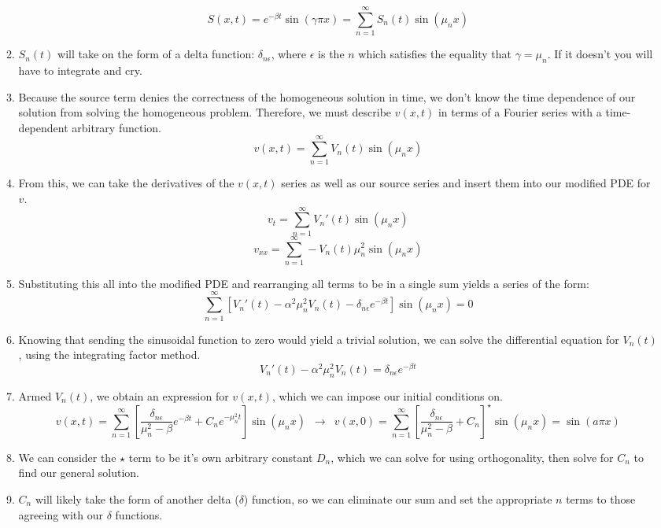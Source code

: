 \documentclass{article}
\begin{document}
\begin{enumerate}
\begin{enumerate}
        \[
            S(x,t) = e^{-\beta t}\sin(\gamma\pi x) = \sum_{n=1}^\infty S_n(t)\sin(\mu_n x)
        \]
        \item $S_n(t)$ will take on the form of a delta function: $\delta_{n\epsilon}$, where $\epsilon$ is the $n$ which satisfies the equality that $\gamma = \mu_n$. If it doesn't you will have to integrate and cry.
        \item Because the source term denies the correctness of the homogeneous solution in time, we don't know the time dependence of our solution from solving the homogeneous problem. Therefore, we must describe $v(x,t)$ in terms of a Fourier series with a time-dependent arbitrary function.
        \[
            v(x,t) = \sum_{n=1}^\infty V_n(t)\sin(\mu_n x)
        \]
        \item From this, we can take the derivatives of the $v(x,t)$ series as well as our source series and insert them into our modified PDE for $v$.
        \[
            v_t = \sum_{n=1}^\infty V_n'(t)\sin(\mu_n x)
        \]
        \[
            v_{xx} = \sum_{n=1}^\infty -V_n(t)\mu_n^2\sin(\mu_n x)
        \]
        \item Substituting this all into the modified PDE and rearranging all terms to be in a single sum yields a series of the form:
        \[
            \sum_{n=1}^\infty \left[V_n'(t) - \alpha^2\mu_n^2V_n(t) - \delta_{n\epsilon}e^{-\beta t}\right]\sin(\mu_n x) = 0
        \]
        \item Knowing that sending the sinusoidal function to zero would yield a trivial solution, we can solve the differential equation for $V_n(t)$, using the integrating factor method.
        \[
            V_n'(t) - \alpha^2\mu_n^2V_n(t) = \delta_{n\epsilon}e^{-\beta t}
        \]
        \item Armed $V_n(t)$, we obtain an expression for $v(x,t)$, which we can impose our initial conditions on.
        \[
            v(x,t) = \sum_{n=1}^\infty\left[\frac{\delta_{n\epsilon}}{\mu_n^2 - \beta}e^{-\beta t} + C_ne^{-\mu_n^2t}\right]\sin(\mu_n x)\, \, \,\to \, \, \, v(x,0) = \sum_{n=1}^\infty\left[\frac{\delta_{n\epsilon}}{\mu_n^2 - \beta}+ C_n\right]^\star\sin(\mu_n x) = \sin(a\pi x)
        \]
        \item We can consider the $\star$ term to be it's own arbitrary constant $D_n$, which we can solve for using orthogonality, then solve for $C_n$ to find our general solution.
        \item $C_n$ will likely take the form of another delta ($\delta$) function, so we can eliminate our sum and set the appropriate $n$ terms to those agreeing with our $\delta$ functions.
    \end{enumerate}
    

\end{enumerate}
\end{document}
